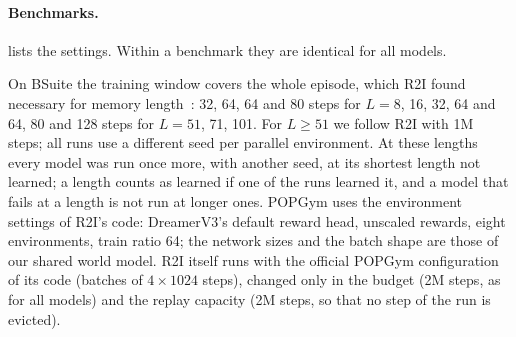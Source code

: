 \paragraph{Benchmarks.}
 lists the settings. Within a benchmark they are identical for all models.

\begin{table}[h]
  \centering\tabfont
  \setlength{\tabcolsep}{3pt}
  \caption{Benchmark settings (all models).}
  \label{tab:supp_bench}
\end{table}

On BSuite the training window covers the whole episode, which R2I found necessary for memory length~\cite{samsami2024r2i}: 32, 64, 64 and 80 steps for $L=8$, 16, 32, 64 and 64, 80 and 128 steps for $L=51$, 71, 101.
For $L\ge51$ we follow R2I with 1M steps; all runs use a different seed per parallel environment.
At these lengths every model was run once more, with another seed, at its shortest length not learned; a length counts as learned if one of the runs learned it, and a model that fails at a length is not run at longer ones.
POPGym uses the environment settings of R2I's code: DreamerV3's default reward head, unscaled rewards, eight environments, train ratio 64; the network sizes and the batch shape are those of our shared world model.
R2I itself runs with the official POPGym configuration of its code (batches of $4\times1024$ steps), changed only in the budget (2M steps, as for all models) and the replay capacity (2M steps, so that no step of the run is evicted).

